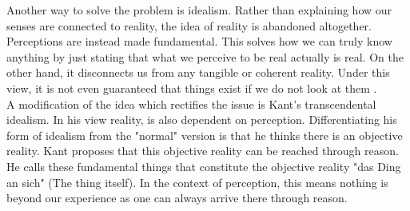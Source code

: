\documentclass[fleqn,14pt]{article}
\begin{document}
Another way to solve the problem is idealism. Rather than explaining how our senses are connected
to reality, the idea of reality is abandoned altogether. Perceptions are instead made fundamental.
This solves how we can truly know anything by just stating that what we perceive
to be real actually is real. On the other hand, it disconnects us from any tangible or coherent reality.
Under this view, it is not even guaranteed that things exist if we do not look at
them \cite[p.73ff]{pritchard}.\\
A modification of the idea which rectifies the issue is Kant's transcendental idealism.
In his view reality, is also dependent on perception. Differentiating his form of idealism from the "normal"
version is that he thinks there is an objective reality\cite{otfried}. Kant proposes that this objective
reality can be reached through reason. He calls these fundamental things that constitute the objective
reality "das Ding an sich" (The thing itself). In the context of perception, this means nothing is beyond our
experience as one can always arrive there through reason. \\
\\
\end{document}
